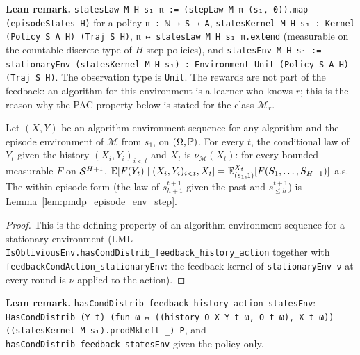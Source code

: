 \textbf{Lean remark.} \texttt{statesLaw M H s₁ π := (stepLaw M π (s₁, 0)).map (episodeStates H)}
for a policy \texttt{π : ℕ → S → A}, \texttt{statesKernel M H s₁ : Kernel (Policy S A H) (Traj S H)},
\texttt{π ↦ statesLaw M H s₁ π.extend} (measurable on the countable discrete type of
$H$-step policies), and \texttt{statesEnv M H s₁ := stationaryEnv (statesKernel M H s₁) : Environment Unit (Policy S A H) (Traj S H)}.
The observation type is \texttt{Unit}. The rewards are not part of the feedback: an
algorithm for this environment is a learner who knows $r$; this is the reason why the PAC
property below is stated for the class $\mathcal M_r$.

\begin{lemma}\label{lem:episode_env_law}
\leanok
{}
Let $(X, Y)$ be an algorithm-environment sequence for any algorithm and the episode
environment of $\mathcal M$ from $s_1$, on $(\Omega, \mathbb{P})$. For every $t$, the conditional law of
$Y_t$ given the history $(X_i, Y_i)_{i < t}$ and $X_t$ is $\nu_{\mathcal M}(X_t)$: for every
bounded measurable $F$ on $\mathcal{S}^{H+1}$,
$\mathbb{E}[F(Y_t) \mid (X_i, Y_i)_{i < t}, X_t] = \mathbb{E}^{X_t}_{(s_1, 1)}[F(S_1, \dots, S_{H+1})]$ a.s. The
within-episode form (the law of $s^{t+1}_{h+1}$ given the past and $s^{t+1}_{\le h}$) is
Lemma~\ref{lem:pmdp_episode_env_step}.
\end{lemma}

\begin{proof}
\leanok
This is the defining property of an algorithm-environment sequence for a stationary environment
(LML \texttt{IsObliviousEnv.hasCondDistrib\_feedback\_history\_action} together with
\texttt{feedbackCondAction\_stationaryEnv}: the feedback kernel of \texttt{stationaryEnv ν} at every
round is $\nu$ applied to the action).
\end{proof}

\textbf{Lean remark.} \texttt{hasCondDistrib\_feedback\_history\_action\_statesEnv}:
\texttt{HasCondDistrib (Y t) (fun ω ↦ ((history O X Y t ω, O t ω), X t ω)) ((statesKernel M s₁).prodMkLeft \_) P},
and \texttt{hasCondDistrib\_feedback\_statesEnv} given the policy only.

